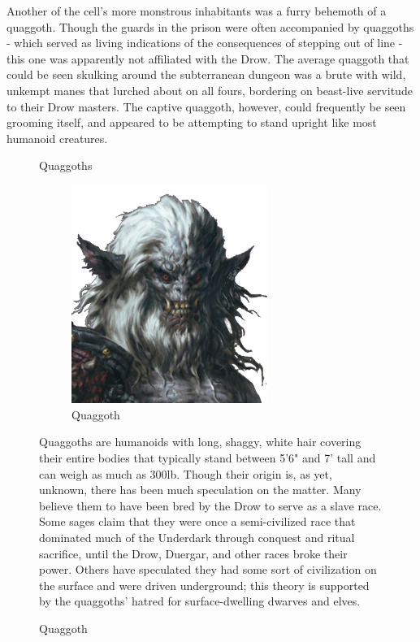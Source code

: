 \documentclass[letterpaper,10pt,twoside,twocolumn,openany]{book}
\begin{document}
Another of the cell's more monstrous inhabitants was a furry behemoth of a quaggoth. Though the guards in the prison were often accompanied by quaggoths - which served as living indications of the consequences of stepping out of line - this one was apparently not affiliated with the Drow. The average quaggoth that could be seen skulking around the subterranean dungeon was a brute with wild, unkempt manes that lurched about on all fours, bordering on beast-live servitude to their Drow masters. The captive quaggoth, however, could frequently be seen grooming itself, and appeared to be attempting to stand upright like most humanoid creatures.\\

\begin{figure}[h]
	\begin{paperbox}{Quaggoths}
		\begin{figure}[H]
			\centering
			\includegraphics[width=0.7\textwidth]{img/dist/quaggoth.png}
			\caption{Quaggoth\label{fig:quaggoth}}
		\end{figure}
		Quaggoths are humanoids with long, shaggy, white hair covering their entire bodies that typically stand between 5'6" and 7' tall and can weigh as much as 300lb. Though their origin is, as yet, unknown, there has been much speculation on the matter. Many believe them to have been bred by the Drow to serve as a slave race. Some sages claim that they were once a semi-civilized race that dominated much of the Underdark through conquest and ritual sacrifice, until the Drow, Duergar, and other races broke their power. Others have speculated they had some sort of civilization on the surface and were driven underground; this theory is supported by the quaggoths' hatred for surface-dwelling dwarves and elves.
	\end{paperbox}
\end{figure}
\end{document}
